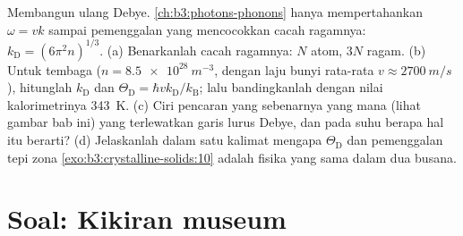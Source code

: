 \begin{exercise}[$\star\star\star$]\label{exo:b3:crystalline-solids:12}
Membangun ulang Debye.  \cref{ch:b3:photons-phonons}
hanya mempertahankan $\omega = vk$ sampai pemenggalan yang mencocokkan cacah ragamnya:
$k_{\text{D}} = (6\pi^2n)^{1/3}$. (a) Benarkanlah cacah ragamnya:
$N$ atom, $3N$ ragam. (b) Untuk tembaga ($n = \qty{8.5e28}{m^{-3}}$,
dengan laju bunyi rata-rata $v \approx \qty{2700}{m/s}$), hitunglah
$k_{\text{D}}$ dan $\Theta_{\text{D}} =
\hbar vk_{\text{D}}/k_{\text{B}}$; lalu bandingkanlah dengan nilai kalorimetrinya
\qty{343}{K}. (c) Ciri pencaran yang sebenarnya yang mana (lihat gambar
bab ini) yang terlewatkan garis lurus Debye, dan pada suhu berapa
hal itu berarti? (d) Jelaskanlah dalam satu kalimat mengapa
$\Theta_{\text{D}}$ dan pemenggalan tepi zona
\cref{exo:b3:crystalline-solids:10} adalah fisika yang sama dalam dua
busana.
\end{exercise}

\section{Soal: Kikiran museum}

